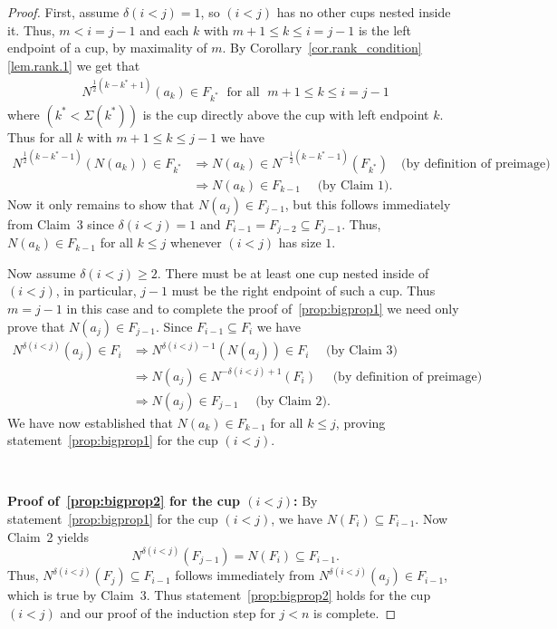 \documentclass[11pt]{amsart}
\theoremstyle{remark}
\theoremstyle{remark}
\theoremstyle{definition}
\theoremstyle{definition}
\theoremstyle{definition}
\numberwithin{equation}{section}
\newcommand{\gd}{\delta}
\newcommand{\E}{\Sigma}
\begin{document}
\begin{proof}
First, assume $\gd(i<j)= 1$, so $(i<j)$ has no other cups nested inside it. Thus, $m<i=j-1$ and each $k$ with $m+1\leq k \leq i=j-1$ is the left endpoint of a cup, by maximality of $m$. By Corollary~\ref{cor.rank_condition}\eqref{lem.rank.1} we get that 
\begin{align*}
    N^{\frac{1}{2}(k-k^*+1)}(a_k) \in F_{k^*}\; \text{ for all } \; m+1\leq k \leq i =j-1
\end{align*}
where $(k^*<\E(k^*))$ is the cup directly above the cup with left endpoint $k$. Thus for all $k$ with $m+1\leq k \leq j-1$ we have
\begin{align*}
N^{\frac{1}{2}(k-k^*-1)}\left(N(a_k)\right) \in F_{k^*} &\Rightarrow N(a_k) \in N^{-\frac{1}{2}(k-k^*-1)}(F_{k^*}) \quad \text{(by definition of preimage) }\\
&\Rightarrow N(a_k)\in F_{k-1} \quad \text{ (by Claim~1).}
\end{align*}
Now it only remains to show that $N(a_j)\in F_{j-1}$, but this follows immediately from Claim~3 since $\gd(i<j)=1$ and $F_{i-1} = F_{j-2}\subseteq F_{j-1}$. Thus, $N(a_k)\in F_{k-1}$ for all $k\leq j$ whenever $(i<j)$ has size $1$. 

Now assume $\gd(i<j)\geq 2$. There must be at least one cup nested inside of $(i<j)$, in particular, $j-1$ must be the right endpoint of such a cup. Thus $m=j-1$ in this case and to complete the proof of~\eqref{prop:bigprop1} we need only prove that $N(a_j)\in F_{j-1}$. Since $F_{i-1}\subseteq F_i$ we have 
\begin{align*}
N^{\gd(i<j)}(a_j)\in F_{i} &\Rightarrow N^{\gd(i<j)-1}\left(N(a_j) \right) \in F_{i} \quad \text{ (by Claim~3)} \\
&\Rightarrow  N(a_j) \in N^{-\gd(i<j)+1 } (F_{i}) \quad \text{ (by definition of preimage) }\\
& \Rightarrow N(a_j) \in F_{j-1} \quad \text{ (by Claim~2). }
\end{align*}
We have now established that $N(a_k)\in F_{k-1}$ for all $k\leq j$, proving statement~\eqref{prop:bigprop1} for the cup $(i<j)$. 

\

\textbf{Proof of~\eqref{prop:bigprop2} for the cup $(i<j)$:}
By statement~\eqref{prop:bigprop1} for the cup $(i<j)$, we have $N\left( F_i \right) \subseteq F_{i-1}$. Now Claim~2 yields
\[
N^{\gd(i<j)} \left( F_{j-1} \right) = N\left( F_i \right) \subseteq F_{i-1}.
\]
Thus, $N^{\gd(i<j)}(F_{j})\subseteq F_{i-1}$ follows immediately from $N^{\gd(i<j)}(a_j)\in F_{i-1}$, which is true by Claim~3. Thus statement~\eqref{prop:bigprop2} holds for the cup $(i<j)$ and our proof of the induction step for $j<n$ is complete.


\end{proof}
\end{document}
